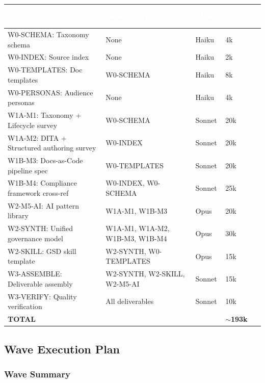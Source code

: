 \documentclass[11pt,letterpaper]{article}
\newcommand{\tableheader}[1]{\textbf{\sffamily\textcolor{white}{#1}}}
\begin{document}
\begin{center}
\begin{tabularx}{\textwidth}{L{3.5cm}L{3cm}L{2cm}C{2cm}}
\toprule
{}
\tableheader{Component} & \tableheader{Dependencies} & \tableheader{Model} & \tableheader{Est. Tokens} \\
\midrule
W0-SCHEMA: Taxonomy schema & None & Haiku & 4k \\
W0-INDEX: Source index & None & Haiku & 2k \\
W0-TEMPLATES: Doc templates & W0-SCHEMA & Haiku & 8k \\
W0-PERSONAS: Audience personas & None & Haiku & 4k \\
W1A-M1: Taxonomy + Lifecycle survey & W0-SCHEMA & Sonnet & 20k \\
W1A-M2: DITA + Structured authoring survey & W0-INDEX & Sonnet & 20k \\
W1B-M3: Docs-as-Code pipeline spec & W0-TEMPLATES & Sonnet & 20k \\
W1B-M4: Compliance framework cross-ref & W0-INDEX, W0-SCHEMA & Sonnet & 25k \\
W2-M5-AI: AI pattern library & W1A-M1, W1B-M3 & Opus & 20k \\
W2-SYNTH: Unified governance model & W1A-M1, W1A-M2, W1B-M3, W1B-M4 & Opus & 30k \\
W2-SKILL: GSD skill template & W2-SYNTH, W0-TEMPLATES & Opus & 15k \\
W3-ASSEMBLE: Deliverable assembly & W2-SYNTH, W2-SKILL, W2-M5-AI & Sonnet & 15k \\
W3-VERIFY: Quality verification & All deliverables & Sonnet & 10k \\
\textbf{TOTAL} & & & \textbf{$\sim$193k} \\
\bottomrule
\end{tabularx}
\end{center}

\subsection{Wave Execution Plan}

\subsubsection{Wave Summary}
\end{document}
